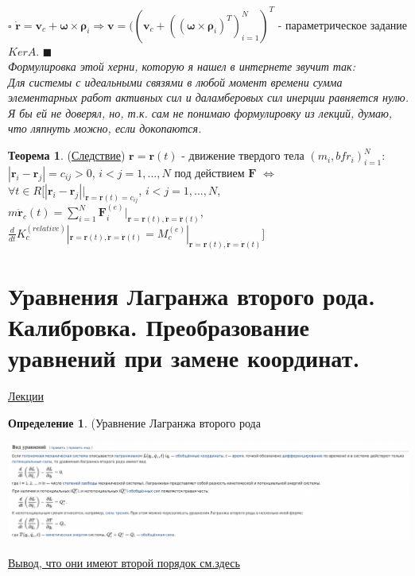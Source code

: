 \documentclass[specialist, subf, href, colorlinks=true, 12pt, times, mtpro, final]{disser}
\theoremstyle{definition}
\newtheorem{defn}{Определение}[section]
\newtheorem{theorem}{Теорема}[section]
\def\note{\textcolor{faded}}
\def\bfr{\mathbf{r}}
\def\bfF{\mathbf{F}}
\def\bfomega{\mathbf{\omega}}
\def\bfv{\mathbf{v}}
\def\bfrho{\mathbf{\rho}}
\begin{document}
    $\square$
    $\dot{\bfr} = \bfv_c + \bfomega\times\bfrho_i \Rightarrow \bfv = ((\bfv_c + ((\bfomega\times\bfrho_i)^T)^N_{i=1})^T$ - параметрическое задание $KerA$. $\blacksquare$\\
    
    \note{\it Формулировка этой херни, которую я нашел в интернете звучит так:\\ Для системы с идеальными связями в любой момент времени сумма элементарных работ активных сил и даламберовых сил инерции равняется нулю. \\Я бы ей не доверял, но, т.к. сам не понимаю формулировку из лекций, думаю, что ляпнуть можно, если докопаются.}
    
     \begin{theorem} (\hyperlink {first_lects.28}{Следствие})
    $\bfr = \bfr(t)$ - движение твердого тела 
    $(m_i, bfr_i)^N_{i=1}$: $|\bfr_i - \bfr_j| = c_{ij} > 0$, $i<j = 1,...,N$ 
    под действием $\bfF$ $\Leftrightarrow$ $\forall t \in R [|\bfr_i - \bfr_j| |_{\bfr=\bfr(t)=c_{ij}}$,
     $i<j=1,...,N$, $m\ddot{\bfr}_c(t)=\sum\limits^N_{i=1} \bfF^{(e)}_i |_{\bfr=\bfr(t), \dot{\bfr}=\dot{\bfr}(t)}$,
      $\frac{d}{dt}K^{(relative)}_c|_{\bfr=\bfr(t), \dot{\bfr}=\dot{\bfr}(t)} = M^{(e)}_c |_{\bfr=\bfr(t), \dot{\bfr}=\dot{\bfr}(t)}]$
      \end{theorem}
     
    
    \section{Уравнения Лагранжа второго рода. Калибровка. Преобразование уравнений при замене координат.}
     \label{7}
    \hyperlink {first_lects.29}{Лекции} \\
    \begin{defn}(Уравнение Лагранжа второго рода
		\begin{center}
 			\includegraphics[scale=0.5]{pics/lagranzh}
		\end{center}
	\end{defn}
	
	\hyperlink {first_lects.29}{Вывод, что они имеют второй порядок см.здесь} \\
	
\end{document}
